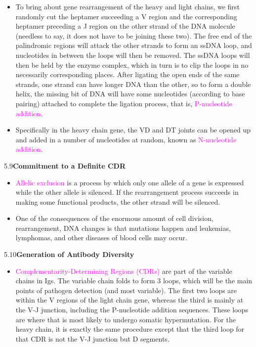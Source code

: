 \documentclass[UTF8]{book}
\newcommand{\pink}[1]{\textcolor{magenta}{#1}}
\begin{document}
\begin{itemize}
\item To bring about gene rearrangement of the heavy and light chains, we first randomly cut the heptamer succeeding a V region and the corresponding heptamer preceding a J region on the other strand of the DNA molecule (needless to say, it does not have to be joining these two). The free end of the palindromic regions will attack the other strands to form an ssDNA loop, and nucleotides in between the loops will then be removed. The ssDNA loops will then be held by the enzyme complex, which in turn is to clip the loops in no necessarily corresponding places. After ligating the open ends of the same strands, one strand can have longer DNA than the other, so to form a double helix, the missing bit of DNA will have some nucleotides (according to base pairing) attached to complete the ligation process, that is, \pink{P-nucleotide addition}.
\item Specifically in the heavy chain gene, the VD and DT joints can be opened up and added in a number of nucleotides at random, known as \pink{N-nucleotide addition}.
\end{itemize}
5.9\quad \textbf{Commitment to a Definite CDR}
\begin{itemize}
\item \pink{Allelic exclusion} is a process by which only one allele of a gene is expressed while the other allele is silenced. If the rearrangement process succeeds in making some functional products, the other strand will be silenced.
\item One of the consequences of the enormous amount of cell division, rearrangement, DNA changes is that mutations happen and leukemias, lymphomas, and other diseases of blood cells may occur.
\end{itemize}
5.10\quad \textbf{Generation of Antibody Diversity}
\begin{itemize}
\item \pink{Complementarity-Determining Regions (CDRs)} are part of the variable chains in Igs. The variable chain folds to form 3 loops, which will be the main points of pathogen detection (and most variable). The first two loops are within the V regions of the light chain gene, whereas the third is mainly at the V-J junction, including the P-nucleotide addition sequences. These loops are where that is most likely to undergo somatic hypermutation. For the heavy chain, it is exactly the same procedure except that the third loop for that CDR is not the V-J junction but D segments.
\end{itemize}
\end{document}
